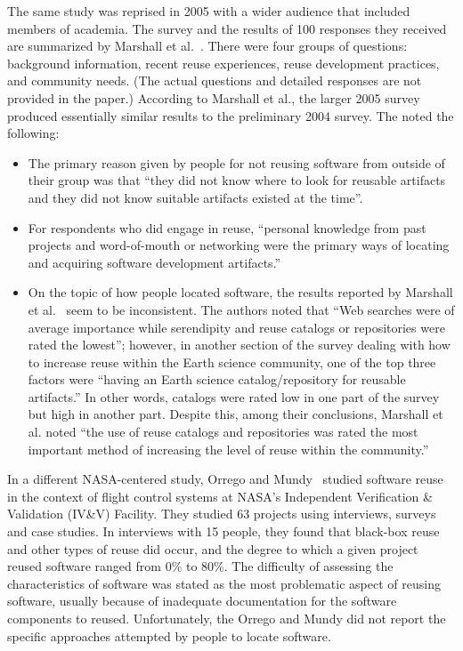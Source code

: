 \documentclass{casicswhitepaper}
\begin{document}
The same study was reprised in 2005 with a wider audience that included members of academia.  The survey and the results of 100 responses they received are summarized by Marshall et al.~\cite{marshall2006software}.  There were four groups of questions: background information, recent reuse experiences, reuse development practices, and community needs.  (The actual questions and detailed responses are not provided in the paper.)  According to Marshall et al., the larger 2005 survey produced essentially similar results to the preliminary 2004 survey.  The noted the following:
\begin{itemize}

\item The primary reason given by people for not reusing software from outside of their group was that ``they did not know where to look for reusable artifacts and they did not know suitable artifacts existed at the time''.

\item For respondents who did engage in reuse, ``personal knowledge from past projects and word-of-mouth or networking were the primary ways of locating and acquiring software development artifacts.''  

\item On the topic of how people located software, the results reported by Marshall et al.~\cite{marshall2006software} seem to be inconsistent.  The authors noted that ``Web searches were of average importance while serendipity and reuse catalogs or repositories were rated the lowest''; however, in another section of the survey dealing with how to increase reuse within the Earth science community, one of the top three factors were ``having an Earth science catalog/repository for reusable artifacts.''  In other words, catalogs were rated low in one part of the survey but high in another part.  Despite this, among their conclusions, Marshall et al. noted ``the use of reuse catalogs and repositories was rated the most important method of increasing the level of reuse within the community.''

\end{itemize}

In a different NASA-centered study, Orrego and Mundy~\cite{orrego_2007_study} studied software reuse in the context of flight control systems at NASA's Independent Verification \& Validation (IV\&V) Facility.  They studied 63 projects using interviews, surveys and case studies.  In interviews with 15 people, they found that black-box reuse and other types of reuse did occur, and the degree to which a given project reused software ranged from 0\% to 80\%.  The difficulty of assessing the characteristics of software was stated as the most problematic aspect of reusing software, usually because of inadequate documentation for the software components to reused.  Unfortunately, the Orrego and Mundy did not report the specific approaches attempted by people to locate software.
\end{document}
